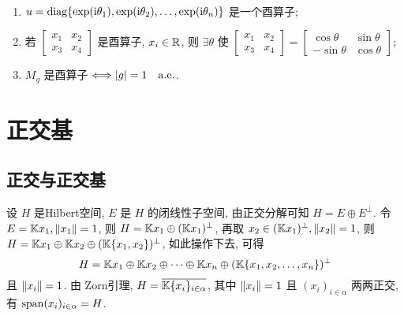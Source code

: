    \begin{Example}~
        \begin{enumerate}[(1)]
            \item $ u=\mathrm{diag}\{ \exp(\mathrm{i} \theta_{1}), \exp(\mathrm{i}\theta_{2}), \dots, \exp(\mathrm{i}\theta_{n}) \} $ 是一个酉算子;
            \item 若
        $ \left[\begin{smallmatrix}
        x_{1} & x_{2}\\
        x_{3} & x_{4}
        \end{smallmatrix}\right] $ 是酉算子, $ x_{i}\in\mathbb{R} $, 则 $ \exists\theta $ 使
        $ \left[\begin{smallmatrix}
            x_{1} & x_{2}\\
            x_{3} & x_{4}
        \end{smallmatrix}\right]=\left[\begin{smallmatrix}
            \cos\theta & \sin\theta \\
            -\sin\theta & \cos\theta
        \end{smallmatrix}\right] $;
        \item $ M_{g} $ 是酉算子 $ \Longleftrightarrow\left| g \right| =1\quad \mathrm{a.e.} $.
        \end{enumerate}
    \end{Example}

\section{正交基}
    \subsection{正交与正交基}
    设 $ H $ 是Hilbert空间, $ E $ 是 $ H $ 的闭线性子空间, 由正交分解可知 $ H=E\oplus E^{\bot} $. 令 $ E=\mathbb{K} x_{1}, \left\| x_{1} \right\|=1 $, 则 $ H=\mathbb{K} x_{1}\oplus (\mathbb{K} x_{1})^{\bot} $, 再取 $ x_{2}\in (\mathbb{K} x_{1})^{\bot}, \left\| x_{2} \right\|=1 $, 则 $ H=\mathbb{K} x_{1}\oplus \mathbb{K} x_{2}\oplus (\mathbb{K}\{ x_{1}, x_{2} \})^{\bot} $, 如此操作下去, 可得
    \[
        H=\mathbb{K} x_{1}\oplus \mathbb{K} x_{2}\oplus\cdots\oplus\mathbb{K} x_{n}\oplus(\mathbb{K} \{ x_{1}, x_{2}, \dots, x_{n} \})^{\bot}
    \]
    且 $ \left\| x_{i} \right\|=1 $. 由 Zorn引理, $ H=\overline{\mathbb{K}\{ x_{i} \}_{i\in\alpha}} $, 其中 $ \left\| x_{i} \right\|=1 $ 且 $ (x_{i})_{i\in\alpha} $ 两两正交, 有 $ \operatorname{span}(x_{i})_{i\in\alpha}=H $.

